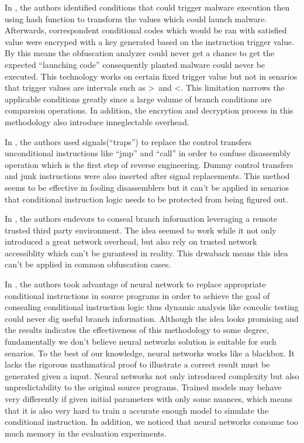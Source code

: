 \documentclass[lnicst]{svmultln}
\begin{document}
In \cite{Sharif}, the authors identified conditions that could trigger malware execution then using hash function to transform the values which could launch malware. Afterwards, correspondent conditional codes which would be ran with satisfied value were encryped with a key generated based on the instruction trigger value.
By this means the obfuscation analyzer could never get a chance to get the expected ``launching code'' consequently planted malware could never be executed. This technology works on certain fixed trigger value but not in senarios that trigger values are intervals such as \textgreater \   and  \textless. This limitation narrows the applicable conditions greatly since a large volume of branch conditions are comparsion operations. In addition, the encrytion and decryption process in this methodology also introduce inneglectable overhead.

In \cite{Popov}, the authors used signals(``traps'') to replace the control transfers unconditional instructions like ``jmp'' and ``call'' in order to confuse disassembly operation which is the first step of reverse engineering. Dummy control transfers and junk instructions were also inserted after signal replacements. This method seems to be effective in fooling disassemblers but it can't be applied in senarios that conditional instruction logic needs to be protected from being figured out.

In \cite{Zhi}, the authors endevors to conseal branch information leveraging a remote trusted third party environment. The idea seemed to work while it not only introduced a great network overhead, but also rely on trusted network accessiblity which can't be guranteed in reality. This drwaback means this idea can't be applied in common obfuscation cases.

In \cite{Ma}, the authors took advantage of neural network to replace appropriate conditional instructions in source programs in order to achieve the goal of consealing conditional instruction logic thus dynamic analysis like concolic testing could never dig useful branch information. Although the idea looks promising and the results indicates the effectiveness of this methodology to some degree, fundamentally we don't believe neural networks solution is suitable for such senarios. To the best of our knowledge,
neural networks works like a blackbox. It lacks the rigorous mathmatical proof to illustrate a correct result must be generated given a input. Neural networks not only introduced complexity but also unpredictability to the original source programs. Trained models may behave very differently if given initial parameters with only some nuances, which means that it is also very hard to train a accurate enough model to simulate the conditional instruction. In addition, we noticed that neural networks consume too much memory in the evaluation experiments.
\end{document}
